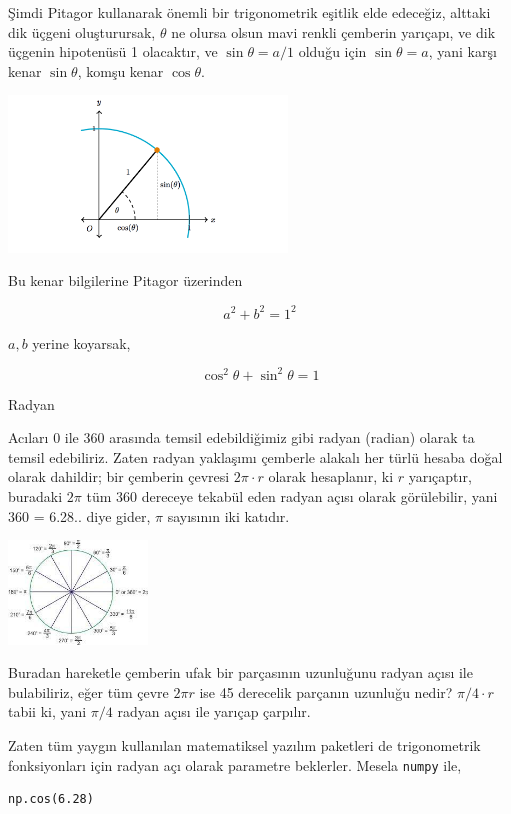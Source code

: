 \documentclass[12pt,fleqn]{article}\usepackage{../../common}
\begin{document}
Şimdi Pitagor kullanarak önemli bir trigonometrik eşitlik elde edeceğiz, alttaki
dik üçgeni oluşturursak, $\theta$ ne olursa olsun mavi renkli çemberin yarıçapı,
ve dik üçgenin hipotenüsü 1 olacaktır, ve $\sin\theta = a / 1$ olduğu için
$\sin\theta = a$, yani karşı kenar $\sin\theta$, komşu kenar $\cos\theta$.

\includegraphics[width=20em]{ode_mattuck_50_trig_02.png}

Bu kenar bilgilerine Pitagor üzerinden

$$
a^2 + b^2 = 1^2 
$$

$a,b$ yerine koyarsak,

$$
\cos^2\theta + \sin^2\theta = 1
$$

Radyan

Acıları 0 ile 360 arasında temsil edebildiğimiz gibi radyan (radian) olarak ta
temsil edebiliriz. Zaten radyan yaklaşımı çemberle alakalı her türlü hesaba
doğal olarak dahildir; bir çemberin çevresi $2 \pi \cdot r$ olarak hesaplanır,
ki $r$ yarıçaptır, buradaki $2 \pi$ tüm 360 dereceye tekabül eden radyan açısı
olarak görülebilir, yani 360 = 6.28.. diye gider, $\pi$ sayısının iki katıdır.

\includegraphics[width=10em]{ode_mattuck_50_trig_05.jpg}

Buradan hareketle çemberin ufak bir parçasının uzunluğunu radyan açısı ile
bulabiliriz, eğer tüm çevre $2 \pi r$ ise 45 derecelik parçanın uzunluğu
nedir? $\pi / 4 \cdot r$ tabii ki, yani $\pi / 4$ radyan açısı ile yarıçap
çarpılır.

Zaten tüm yaygın kullanılan matematiksel yazılım paketleri de trigonometrik
fonksiyonları için radyan açı olarak parametre beklerler. Mesela \verb!numpy!
ile,

\begin{verbatim}
np.cos(6.28)
\end{verbatim}
\end{document}
